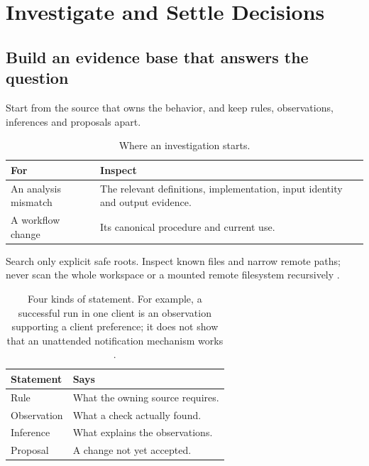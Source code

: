 \chapter{Investigate and Settle Decisions}\label{ch:decisions}
\section{Build an evidence base that answers the question}

\begin{headline}
  Start from the source that owns the behavior, and keep rules, observations, inferences
  and proposals apart.
\end{headline}

\begin{table}[H]
  \small
  \begin{tabularx}{\textwidth}{L{0.25\textwidth}Y}
    \toprule
    For & Inspect \\
    \midrule
    An analysis mismatch & The relevant definitions, implementation, input identity and
    output evidence. \\
    A workflow change & Its canonical procedure and current use. \\
    \bottomrule
  \end{tabularx}
  \caption{Where an investigation starts.}
  \label{tab:decisions-start}
\end{table}

\begin{rulebox}
  Search only explicit safe roots. Inspect known files and narrow remote paths; never scan
  the whole workspace or a mounted remote filesystem recursively \cite[Remote checkouts and
    execution]{skill:remote}.
\end{rulebox}

\begin{table}[H]
  \small
  \begin{tabularx}{\textwidth}{L{0.2\textwidth}Y}
    \toprule
    Statement & Says \\
    \midrule
    Rule & What the owning source requires. \\
    Observation & What a check actually found. \\
    Inference & What explains the observations. \\
    Proposal & A change not yet accepted. \\
    \bottomrule
  \end{tabularx}
  \caption{Four kinds of statement. For example, a successful run in one client is
    an observation supporting a client preference; it
    does not show that an unattended notification mechanism works \cite[Source traceability
      and corroboration]{skill:report-production}.}
  \label{tab:decisions-statements}
\end{table}

